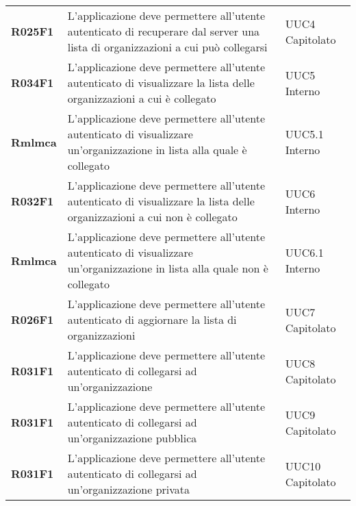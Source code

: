 \documentclass[../analisi-dei-requisiti.tex]{subfiles}
\begin{document}
\begin{longtable}[H]{>{\centering\bfseries}m{3cm} >{\centering}m{10cm} >{\centering\arraybackslash}m{3cm}}
  R025F1                               & L'applicazione deve permettere all'utente autenticato di recuperare dal server una lista di organizzazioni a cui può collegarsi                                                                         & UUC4 Capitolato               \\
  R034F1                               & L'applicazione deve permettere all'utente autenticato di visualizzare la lista delle organizzazioni a cui è collegato                                                                                   & UUC5 Interno                  \\
  Rmlmca                               & L'applicazione deve permettere all'utente autenticato di visualizzare un'organizzazione in lista alla quale è collegato                                                                                 & UUC5.1 Interno                \\
  R032F1                               & L'applicazione deve permettere all'utente autenticato di visualizzare la lista delle organizzazioni a cui non è collegato                                                                               & UUC6 Interno                  \\
  Rmlmca                               & L'applicazione deve permettere all'utente autenticato di visualizzare un'organizzazione in lista alla quale non è collegato                                                                             & UUC6.1 Interno                \\
  R026F1                               & L'applicazione deve permettere all'utente autenticato di aggiornare la lista di organizzazioni                                                                                                          & UUC7 Capitolato               \\
  R031F1                               & L'applicazione deve permettere all'utente autenticato di collegarsi ad un'organizzazione                                                                                                                & UUC8 Capitolato               \\
  R031F1                               & L'applicazione deve permettere all'utente autenticato di collegarsi ad un'organizzazione pubblica                                                                                                       & UUC9 Capitolato               \\
  R031F1                               & L'applicazione deve permettere all'utente autenticato di collegarsi ad un'organizzazione privata                                                                                                        & UUC10 Capitolato              \\

\end{longtable}
\end{document}
